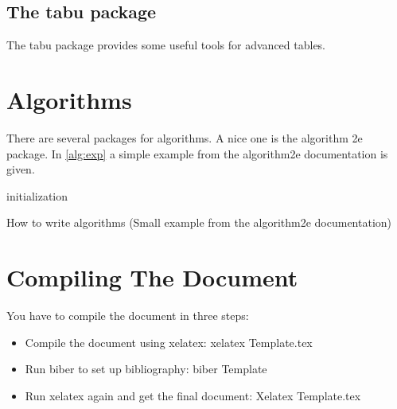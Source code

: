 \documentclass[12pt, %
               a4paper, %
               twoside, %
               openright, %
               abstract=on, %
               DIV=11,      %
               BCOR=8mm]{scrbook} %
\begin{document}
\subsection{The tabu package}
The tabu package provides some useful tools for advanced tables.



\section{Algorithms}
There are several packages for algorithms.
A nice one is the algorithm 2e package.
In \cref{alg:exp} a simple example from the algorithm2e documentation is given.


\begin{algorithm}[H]
	\SetAlgoLined
	initialization\;
	\caption{How to write algorithms (Small example from the algorithm2e documentation)}
	\label{alg:exp}
\end{algorithm}
\FloatBarrier

\section{Compiling The Document}
You have to compile the document in three steps:
\begin{itemize}
	\item Compile the document using xelatex: xelatex Template.tex
 \item Run biber to set up bibliography: biber Template
 \item Run xelatex again and get the final document: Xelatex Template.tex
\end{itemize}

\backmatter

\begin{singlespacing}
\printbibliography
\end{singlespacing}
\FloatBarrier
\end{document}
